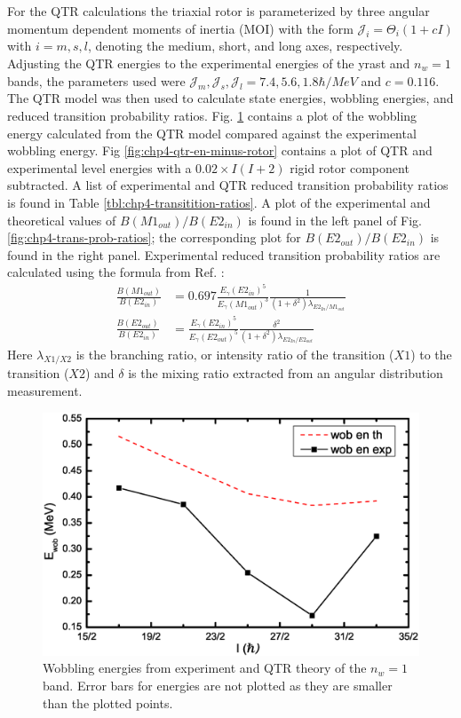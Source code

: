 For the QTR calculations the triaxial rotor is parameterized by three angular momentum dependent moments of inertia (MOI) with the form $\mathcal{J}_i=\Theta_i(1+cI)$ with $i=m,s,l$, denoting the medium, short, and long axes, respectively. Adjusting the QTR energies to the experimental energies of the yrast and $n_w=1$ bands, the parameters used were $\mathcal{J}_m,\mathcal{J}_s,\mathcal{J}_l = 7.4, 5.6, 1.8 \hbar{}/MeV$ and $c=0.116$. The QTR model was then used to calculate state energies, wobbling energies, and reduced transition probability ratios. Fig. \ref{fig:chp4-wobb-en} contains a plot of the wobbling energy calculated from the QTR model compared against the experimental wobbling energy. Fig \ref{fig:chp4-qtr-en-minus-rotor} contains a plot of QTR and experimental level energies with a $0.02\times{}I(I+2)$ rigid rotor component subtracted. A list of experimental and QTR reduced transition probability ratios is found in Table \ref{tbl:chp4-transitition-ratios}. A plot of the experimental and theoretical values of $B(M1_{out})/B(E2_{in})$ is found in the left panel of Fig. \ref{fig:chp4-trans-prob-ratios}; the corresponding plot for $B(E2_{out})/B(E2_{in})$ is found in the right panel. Experimental reduced transition probability ratios are calculated using the formula from Ref. \cite{exoticNuclearExcitations}:
\begin{align}
\label{eqn:chp4-red-trans-prob-ratios}
\frac{B(M1_{out})}{B(E2_{in})} &= 0.697 \frac{E_{\gamma}(E2_{in})^5}{E_{\gamma}(M1_{out})^3}\frac{1}{(1+\delta^2)\lambda{}_{E2_{In}/M1_{out}}}\\
\frac{B(E2_{out})}{B(E2_{in})} &= \frac{E_{\gamma}(E2_{in})^5}{E_{\gamma}(E2_{out})^5}\frac{\delta^2}{(1+\delta^2)\lambda{}_{E2_{In}/E2_{out}}}
\end{align}
Here $\lambda{}_{X1/X2}$ is the branching ratio, or intensity ratio of the transition ($X1$) to the transition ($X2$) and $\delta$ is the mixing ratio extracted from an angular distribution measurement.

\begin{figure}[t!]
\centerline{\includegraphics[width=\textwidth]{./img/c4/wob_en.eps}}
	\caption{Wobbling energies from experiment and QTR theory of the $n_w=1$ band. Error bars for energies are not plotted as they are smaller than the plotted points.\label{fig:chp4-wobb-en}}
\end{figure}

